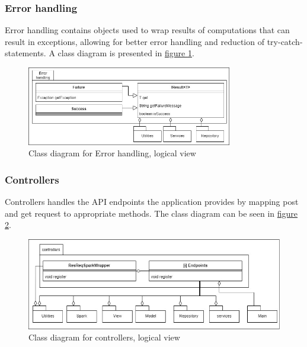 \subsubsection{Error handling}
Error handling contains objects used to wrap results of computations that can result in exceptions, allowing for better error handling and reduction of try-catch-statements. A class diagram is presented in  \hyperref[fig:classDiagramErrorhandling]{figure \ref{fig:classDiagramErrorhandling}}.
\begin{figure}[H]
    \centering
    \includegraphics[width=0.8\textwidth]{images/class_diagram_errorhandling.jpg}
    \caption{Class diagram for Error handling, logical view}
    \label{fig:classDiagramErrorhandling}
\end{figure}

\subsubsection{Controllers}
Controllers handles the API endpoints the application provides by mapping post and get request to appropriate methods. The class diagram can be seen in \hyperref[fig:classDiagramControllers]{figure \ref{fig:classDiagramControllers}}.
\begin{figure}[H]
    \centering
    \includegraphics[width=1.0\textwidth]{images/class_diagram_controllers.jpg}
    \caption{Class diagram for controllers, logical view}
    \label{fig:classDiagramControllers}
\end{figure}

